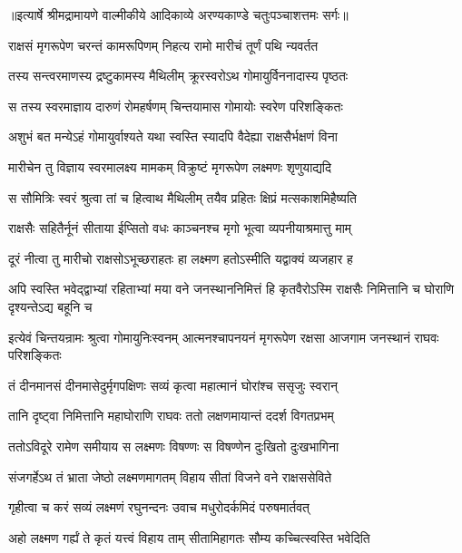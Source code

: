 {॥इत्यार्षे श्रीमद्रामायणे वाल्मीकीये आदिकाव्ये अरण्यकाण्डे चतुःपञ्चाशत्तमः सर्गः॥}


\twolineshloka
{राक्षसं मृगरूपेण चरन्तं कामरूपिणम्}
{निहत्य रामो मारीचं तूर्णं पथि न्यवर्तत} %

\twolineshloka
{तस्य सन्त्वरमाणस्य द्रष्टुकामस्य मैथिलीम्}
{क्रूरस्वरोऽथ गोमायुर्विननादास्य पृष्ठतः} %

\twolineshloka
{स तस्य स्वरमाज्ञाय दारुणं रोमहर्षणम्}
{चिन्तयामास गोमायोः स्वरेण परिशङ्कितः} %

\twolineshloka
{अशुभं बत मन्येऽहं गोमायुर्वाश्यते यथा}
{स्वस्ति स्यादपि वैदेह्या राक्षसैर्भक्षणं विना} %

\twolineshloka
{मारीचेन तु विज्ञाय स्वरमालक्ष्य मामकम्}
{विक्रुष्टं मृगरूपेण लक्ष्मणः शृणुयाद्यदि} %

\twolineshloka
{स सौमित्रिः स्वरं श्रुत्वा तां च हित्वाथ मैथिलीम्}
{तयैव प्रहितः क्षिप्रं मत्सकाशमिहैष्यति} %

\twolineshloka
{राक्षसैः सहितैर्नूनं सीताया ईप्सितो वधः}
{काञ्चनश्च मृगो भूत्वा व्यपनीयाश्रमात्तु माम्} %

\twolineshloka
{दूरं नीत्वा तु मारीचो राक्षसोऽभूच्छराहतः}
{हा लक्ष्मण हतोऽस्मीति यद्वाक्यं व्यजहार ह} %

\threelineshloka
{अपि स्वस्ति भवेद्द्वाभ्यां रहिताभ्यां मया वने}
{जनस्थाननिमित्तं हि कृतवैरोऽस्मि राक्षसैः}
{निमित्तानि च घोराणि दृश्यन्तेऽद्य बहूनि च} %

\threelineshloka
{इत्येवं चिन्तयन्रामः श्रुत्वा गोमायुनिःस्वनम्}
{आत्मनश्चापनयनं मृगरूपेण रक्षसा}
{आजगाम जनस्थानं राघवः परिशङ्कितः} %

\twolineshloka
{तं दीनमानसं दीनमासेदुर्मृगपक्षिणः}
{सव्यं कृत्वा महात्मानं घोरांश्च ससृजुः स्वरान्} %

\twolineshloka
{तानि दृष्ट्वा निमित्तानि महाघोराणि राघवः}
{ततो लक्षणमायान्तं ददर्श विगतप्रभम्} %

\twolineshloka
{ततोऽविदूरे रामेण समीयाय स लक्ष्मणः}
{विषण्णः स विषण्णेन दुःखितो दुःखभागिना} %

\twolineshloka
{संजगर्हेऽथ तं भ्राता जेष्ठो लक्ष्मणमागतम्}
{विहाय सीतां विजने वने राक्षससेविते} %

\twolineshloka
{गृहीत्वा च करं सव्यं लक्ष्मणं रघुनन्दनः}
{उवाच मधुरोदर्कमिदं परुषमार्तवत्} %

\twolineshloka
{अहो लक्ष्मण गर्ह्यं ते कृतं यत्त्वं विहाय ताम्}
{सीतामिहागतः सौम्य कच्चित्स्वस्ति भवेदिति} %

